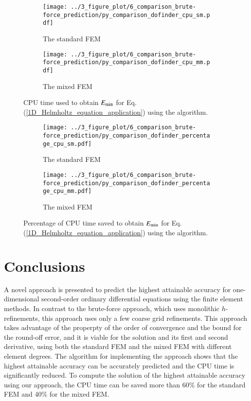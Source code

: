 \documentclass[review,3p]{elsarticle}
\begin{document}
\begin{figure}[!ht]
	\centering
    \begin{subfigure}{6.0cm}
        \texttt{[image: ../3\_figure\_plot/6\_comparison\_brute-force\_prediction/py\_comparison\_dofinder\_cpu\_sm.pdf]}
        \caption{The standard FEM}
        \label{CPU_application_sm}
    \end{subfigure}
    \hspace{0.0cm}
    \begin{subfigure}{6.0cm}	                		 	
        \texttt{[image: ../3\_figure\_plot/6\_comparison\_brute-force\_prediction/py\_comparison\_dofinder\_cpu\_mm.pdf]}
        \caption{The mixed FEM}
        \label{CPU_application_mm}
    \end{subfigure}
\caption{CPU time used to obtain $E_{\rm min}$ for Eq. (\ref{1D_Helmholtz_equation_application}) using the algorithm.}
\label{CPU_application}
\end{figure}

\begin{figure}[!ht]
	\centering
    \begin{subfigure}{6.0cm}
        \texttt{[image: ../3\_figure\_plot/6\_comparison\_brute-force\_prediction/py\_comparison\_dofinder\_percentage\_cpu\_sm.pdf]}
        \caption{The standard FEM}
        \label{CPU_percentage_application_sm}
    \end{subfigure}
    \hspace{0.0cm}
    \begin{subfigure}{6.0cm}	                		 	
        \texttt{[image: ../3\_figure\_plot/6\_comparison\_brute-force\_prediction/py\_comparison\_dofinder\_percentage\_cpu\_mm.pdf]}
        \caption{The mixed FEM}
        \label{CPU_percentage_application_mm}
    \end{subfigure}
\caption{Percentage of CPU time saved to obtain $E_{\rm min}$ for Eq. (\ref{1D_Helmholtz_equation_application}) using the algorithm.}
\label{CPU_percentage_application}
\end{figure}


\section{Conclusions}		\label{paragraph on conclusion}

A novel approach is presented to predict the highest attainable accuracy for one-dimensional second-order ordinary differential equations using the finite element methods.
In contrast to the brute-force approach, which uses monolithic $h$-refinements, this approach uses only a few coarse grid refinements. 
This approach takes advantage of the properpty of the order of convergence and the bound for the round-off error, and it is viable for the solution and its first and second derivative, using both the standard FEM and the mixed FEM with different element degrees.
The algorithm for implementing the approach shows that the highest attainable accuracy can be accurately predicted and the CPU time is significantly reduced. To compute the solution of the highest attainable accuracy using our approach, the CPU time can be saved more than 60\% for the standard FEM and 40\% for the mixed FEM.
\end{document}
